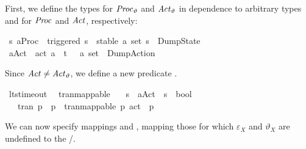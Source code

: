 \begin{isabellebody}
\begin{isamarkuptext}
First, we define the types for $\mathit{Proc}_\vartheta$ and $\mathit{Act}_\vartheta$ in dependence to arbitrary types  and  for $\mathit{Proc}$ and $\mathit{Act}$, respectively:%
\end{isamarkuptext}\isamarkuptrue%
\isamarkupfalse%
\ {\isacharparenleft}{\kern0pt}{\isacharprime}{\kern0pt}s{\isacharcomma}{\kern0pt}\ {\isacharprime}{\kern0pt}a{\isacharparenright}{\kern0pt}Proc{\isacharunderscore}{\kern0pt}{\isasymtheta}\ {\isacharequal}{\kern0pt}\ triggered\ {\isacharprime}{\kern0pt}s\ {\isacharbar}{\kern0pt}\ stable\ {\isacartoucheopen}{\isacharprime}{\kern0pt}a\ set{\isacartoucheclose}\ {\isacharprime}{\kern0pt}s\ {\isacharbar}{\kern0pt}\ DumpState\isanewline
{}\isamarkupfalse%
\ {\isacharparenleft}{\kern0pt}{\isacharprime}{\kern0pt}a{\isacharparenright}{\kern0pt}Act{\isacharunderscore}{\kern0pt}{\isasymtheta}\ {\isacharequal}{\kern0pt}\ act\ {\isacharprime}{\kern0pt}a\ {\isacharbar}{\kern0pt}\ t{\isacharunderscore}{\kern0pt}{\isasymepsilon}\ {\isacharbar}{\kern0pt}\ {\isasymepsilon}\ {\isacartoucheopen}{\isacharprime}{\kern0pt}a\ set{\isacartoucheclose}\ {\isacharbar}{\kern0pt}\ DumpAction%
\begin{isamarkuptext}%
Since $\mathit{Act} \neq \mathit{Act}_\vartheta$, we define a new predicate .%
\end{isamarkuptext}\isamarkuptrue%
\isamarkupfalse%
\ lts{\isacharunderscore}{\kern0pt}timeout\ \isanewline
\isanewline
{}\isamarkupfalse%
\ tran{\isacharunderscore}{\kern0pt}mappable\isanewline
\ \ {\isacharcolon}{\kern0pt}{\isacharcolon}{\kern0pt}\ {\isacartoucheopen}{\isacharprime}{\kern0pt}s\ {\isasymRightarrow}\ {\isacharparenleft}{\kern0pt}{\isacharprime}{\kern0pt}a{\isacharparenright}{\kern0pt}Act{\isacharunderscore}{\kern0pt}{\isasymtheta}\ {\isasymRightarrow}\ {\isacharprime}{\kern0pt}s\ {\isasymRightarrow}\ bool{\isacartoucheclose}\ \isanewline
\ \ \ {\isacartoucheopen}tran\ p\ {\isasymalpha}\ p{\isacharprime}{\kern0pt}\ {\isasymLongrightarrow}\ tran{\isacharunderscore}{\kern0pt}mappable\ p\ {\isacharparenleft}{\kern0pt}act\ {\isasymalpha}{\isacharparenright}{\kern0pt}\ p{\isacharprime}{\kern0pt}{\isacartoucheclose}%
\begin{isamarkuptext}%
We can now specify mappings  and , mapping those  for which $\varepsilon_X$ and $\vartheta_X$ are undefined to the /.%

\end{isamarkuptext}
\end{isabellebody}
